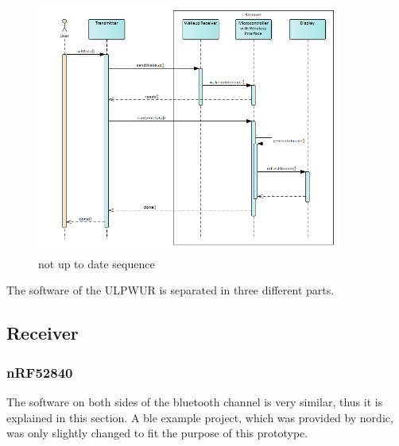 \begin{figure}[ht]
	\centering
	\includegraphics[width=0.9\textwidth]{4-development/software/graphics/1.png}
	\caption{not up to date sequence\label{software:sequence}}
\end{figure}

The software of the ULPWUR is separated in three different parts. 


\subsection{Receiver}

\subsubsection{nRF52840}
The software on both sides of the bluetooth channel is very similar, thus it is explained in this section.
A \acs{ble} example project, which was provided by nordic, was only slightly changed to fit the purpose of this prototype.

